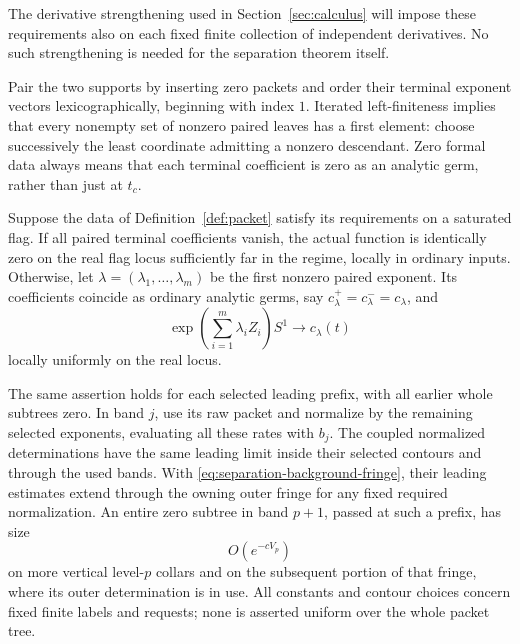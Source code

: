 The derivative strengthening used in Section~\ref{sec:calculus}
will impose these requirements also on each fixed finite collection
of independent derivatives.  No such strengthening is needed for
the separation theorem itself.

Pair the two supports by inserting zero packets and order their
terminal exponent vectors lexicographically, beginning with index
$1$.  Iterated left-finiteness implies that every nonempty set of
nonzero paired leaves has a first element: choose successively the
least coordinate admitting a nonzero descendant.  Zero formal data
always means that each terminal coefficient is zero as an analytic
germ, rather than just at $t_c$.

\begin{theorem}[Separation]\label{thm:separation}
Suppose the data of Definition~\ref{def:packet} satisfy its
requirements on a saturated flag.
If all paired terminal coefficients vanish, the actual function
is identically zero on the real flag locus sufficiently far in the
regime, locally in ordinary inputs.  Otherwise, let
$\lambda=(\lambda_1,\ldots,\lambda_m)$ be the first nonzero
paired exponent.  Its coefficients coincide as ordinary analytic
germs, say $c^+_\lambda=c^-_\lambda=c_\lambda$, and
\begin{equation}\label{eq:separation-leading}
 \exp\!\left(\sum_{i=1}^m\lambda_i Z_i\right)S^1
       \longrightarrow c_\lambda(t)
\end{equation}
locally uniformly on the real locus.

The same assertion holds for each selected leading prefix, with
all earlier whole subtrees zero.  In band $j$, use its raw packet
and normalize by the remaining selected exponents, evaluating all
these rates with $b_j$.  The coupled normalized determinations have
the same leading limit inside their selected contours and through
the used bands.  With
\eqref{eq:separation-background-fringe}, their leading estimates
extend through the owning outer fringe for any fixed required
normalization.  An entire zero subtree in band $p+1$, passed at
such a prefix, has size
\begin{equation}\label{eq:separation-zero-fringe}
 O(e^{-cV_p})
\end{equation}
on more vertical level-$p$ collars and on the subsequent portion
of that fringe, where its outer determination is in use.
All constants and contour choices concern fixed finite labels and
requests; none is asserted uniform over the whole packet tree.
\end{theorem}

